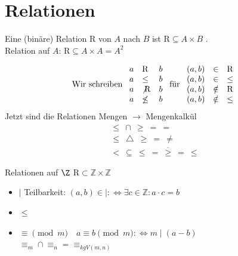 \section{Relationen}
\begin{def*}[note = Relation , index = Relation]
	Eine (binäre) Relation $\mathrm{R}$ von $A$ nach $B$ ist $\mathrm{R} \subseteq A \times B$ . \\
	Relation auf $A$: $\mathrm{R} \subseteq A \times A = A^2$
\end{def*}
\[
	\text{Wir schreiben } \begin{array}{ l l l }
		a &\mathrm{R}		&b			\\
		a &\leq			&b			\\
		a &\not{\mathrm{R}}	&b			\\
		a &\not\leq		&b	
	\end{array} \text{ für } \begin{array}{ l l l }
		(a , b) &\in			&\mathrm{R}	\\
		(a , b) &\in			&\leq			\\
		(a , b) &\notin		&\mathrm{R}	\\
		(a , b) &\notin		&\leq		
	\end{array}
\]
Jetzt sind die Relationen Mengen $\rightarrow$ Mengenkalkül
\begin{gather*}
	\leq~\cap~\geq~=~= \\
	\leq~\bigtriangleup~\geq~=~\neq \\
	<~\subseteq~\leq~=~\overline{\geq}~=~\leq
\end{gather*}
\begin{bsp*}{Relationen auf $\Z$}
	$\mathrm{R} \subset \mathbb{Z} \times \mathbb{Z}$ \\
	\begin{itemize}
		\item $\mid$ Teilbarkeit: \quad $(a , b) \in \mid :\iff \exists c \in \mathbb{Z} : a \cdot c = b$
		\item $\leq$
		\item $\equiv \pmod m \quad a \equiv b \pmod m :\iff m \mid (a - b)$ \\
			$ \equiv_m \cap \equiv_n = \equiv_{kgV(m,n)}$
	\end{itemize}
\end{bsp*}

